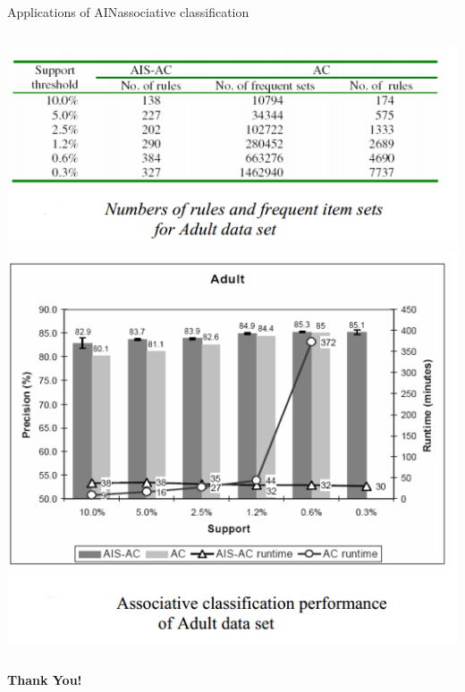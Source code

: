 \begin{frame}{Applications of AIN}{associative classification}
\begin{columns}[c] 
\includegraphics[scale=0.45]{img/associative_classification_table.png}
\includegraphics[scale=0.3]{img/associative_classification_figure.png}
\end{columns}
\end{frame}


\begin{frame}
\centering \Huge \textbf{Thank You!}
\end{frame}
